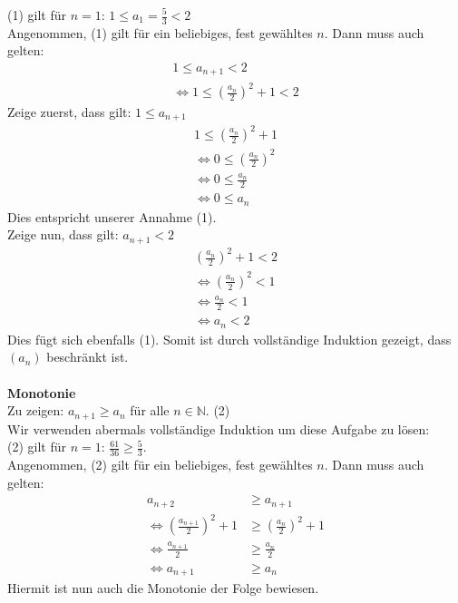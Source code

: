 \documentclass [a4paper,11pt]{article}
\begin{document}
\begin{enumerate}
                (1) gilt für $n=1$: $1 \leq a_1= \frac{5}{3} < 2$ \\
                Angenommen, (1) gilt für ein beliebiges, fest gewähltes $n$. Dann muss auch gelten:\\
                \begin{align}
                    1 \leq a_{n+1} < 2 \\
                    \Leftrightarrow 1 \leq ( \frac{a_n}{2} )^2 + 1 < 2
                \end{align}
                Zeige zuerst, dass gilt: $1 \leq a_{n+1}$
                \begin{align}
                    1 \leq ( \frac{a_n}{2} )^2 + 1 \\
                    \Leftrightarrow 0 \leq ( \frac{a_n}{2} )^2 \\
                    \Leftrightarrow 0 \leq \frac{a_n}{2} \\
                    \Leftrightarrow 0 \leq a_n
                \end{align}
                Dies entspricht unserer Annahme (1).\\
                Zeige nun, dass gilt: $a_{n+1} < 2$
                \begin{align}
                    ( \frac{a_n}{2} )^2 + 1 < 2 \\
                    \Leftrightarrow ( \frac{a_n}{2} )^2 < 1 \\
                    \Leftrightarrow \frac{a_n}{2} < 1 \\
                    \Leftrightarrow a_n < 2
                \end{align}
                Dies fügt sich ebenfalls (1). Somit ist durch vollständige Induktion gezeigt, dass $(a_n)$ beschränkt ist. \\
                \\
            \textbf{Monotonie}\\
                Zu zeigen: $a_{n+1} \geq a_n$ für alle $n \in \mathbb{N}$. (2)\\
                Wir verwenden abermals vollständige Induktion um diese Aufgabe zu lösen: \\
                (2) gilt für $n=1$: $\frac{61}{36} \geq \frac{5}{3}$. \\
                Angenommen, (2) gilt für ein beliebiges, fest gewähltes $n$. Dann muss auch gelten:
                \begin{align}
                    a_{n+2} &\geq a_{n+1} \\
                    \Leftrightarrow ( \frac{a_{n+1}}{2} )^2 + 1 &\geq ( \frac{a_n}{2} )^2 + 1 \\
                    \Leftrightarrow \frac{a_{n+1}}{2} &\geq \frac{a_n}{2} \\
                    \Leftrightarrow a_{n+1} &\geq a_n
                \end{align}
                Hiermit ist nun auch die Monotonie der Folge bewiesen.
            
            

    \end{enumerate}
\end{document}
